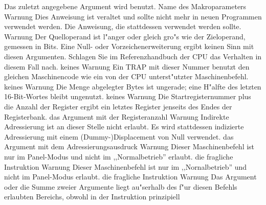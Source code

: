 \documentclass[12pt,a4paper,twoside]{report}
\begin{document}
\begin{description}
{                Das zuletzt angegebene Argument wird benutzt.}
               {Name des Makroparameters}
               {Warnung}
               {Dies Anweisung ist veraltet und sollte nicht mehr
                in neuen Programmen verwendet werden.}
               {Die Anweisung, die stattdessen verwendet werden sollte.}
               {Warnung}
               {Der Quelloperand ist l"anger oder gleich gro"s wie der
                Zieloperand, gemessen in Bits.  Eine Null- oder Vorzeichenerweiterung
                ergibt keinen Sinn mit diesen Argumenten.  Schlagen Sie im 
                Referenzhandbuch der CPU das Verhalten in diesem Fall nach.}
               {keines}
               {Warnung}
               {Ein TRAP mit dieser Nummer benutzt den gleichen Maschinencode
                wie ein von der CPU unterst"utzter Maschinenbefehl.}
               {keines}
               {Warnung}
               {Die Menge abgelegter Bytes ist ungerade; eine H"alfte des letzten
                16-Bit-Wortes bleibt ungenutzt.}
               {keines}
               {Warnung}
               {Die Startregisternummer plus die Anzahl der Register ergibt ein
                letztes Register jenseits des Endes der Registerbank.}
               {das Argument mit der Registeranzahl}
               {Warnung}
               {Indirekte Adressierung ist an dieser Stelle nicht erlaubt.
                Es wird stattdessen indizierte Adressierung mit einem
                (Dummy-)Displacement von Null verwendet.}
               {das Argument mit dem Adressierungsausdruck}
               {Warnung}
               {Dieser Maschinenbefehl ist nur im Panel-Modus und nicht
                im ,,Normalbetrieb'' erlaubt.}
               {die fragliche Instruktion}
               {Warnung}
               {Dieser Maschinenbefehl ist nur im ,,Nornalbetrieb''
                und nicht im Panel-Modus erlaubt.}
               {die fragliche Instruktion}
               {Warnung}
               {Das Argument oder die Summe zweier Argumente
                liegt au"serhalb des f"ur diesen Befehls erlaubten
                Bereichs, obwohl in der Instruktion prinzipiell
}
\end{description}
\end{document}
